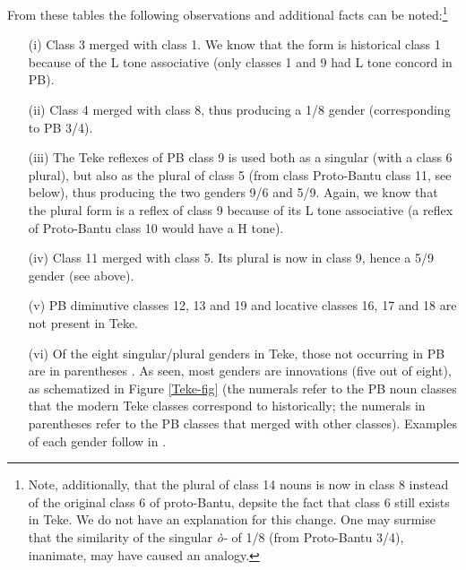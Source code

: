 \documentclass[output=paper,,modfonts,nonflat]{langsci/langscibook}
\begin{document}
From these tables the following observations and additional facts can be noted:\footnote{Note, additionally, that the plural of class 14 nouns is now in class 8 instead of the original class 6 of proto-Bantu, depsite the fact that class 6 still exists in Teke. We do not have an explanation for this change. One may surmise that the similarity of the singular \emph{ò-} of 1/8 (from Proto-Bantu 3/4), inanimate, may have caused an analogy.}
\begin{enumerate}[noitemsep]
\item[(i)] Class 3 merged with class 1. We know that the form is historical class 1 because of the L tone associative (only classes 1 and 9 had L tone concord in PB).
\item[(ii)] Class 4 merged with class 8, thus producing a 1/8 gender (corresponding to PB 3/4).
\item[(iii)]  The Teke reflexes of PB class 9 is used both as a singular (with a class 6 plural), but also as the plural of class 5 (from class Proto-Bantu class 11, see below), thus producing the two genders 9/6 and 5/9. Again, we know that the plural form is a reflex of class 9 because of its L tone associative (a reflex of Proto-Bantu class 10 would have a H tone).
\item[(iv)]  Class 11 merged with class 5. Its plural is now in class 9, hence a 5/9 gender (see above).
\item[(v)]  PB diminutive classes 12, 13 and 19 and locative classes 16, 17 and 18 are not present in Teke.
\item[(vi)]  Of the eight singular/plural genders in Teke, those not occurring in PB are in parentheses . As seen, most genders are innovations (five out of eight), as schematized in Figure \ref{Teke-fig} (the numerals refer to the PB noun classes that the modern Teke classes correspond to historically; the numerals in parentheses refer to the PB classes that merged with other classes). Examples of each gender follow in . 
\end{enumerate} 
\end{document}

